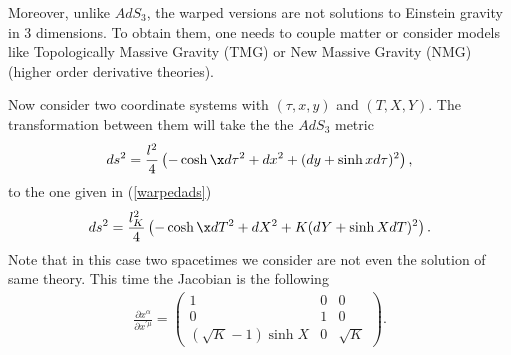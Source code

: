 \documentclass[preprint,aps,tightenlines,showkeys,nofootinbib,superscriptaddress,amsmath]{revtex4}
\begin{document}
Moreover, unlike $AdS_3$, the warped versions are not solutions to
Einstein gravity in 3 dimensions. To obtain them, one needs to couple matter or
consider models like Topologically Massive Gravity (TMG) or New
Massive Gravity (NMG) (higher order derivative theories).

Now consider two coordinate systems with $(\tau,x,y)$ and $(T,X,Y)$.
The transformation between them will take the the $AdS_3$ metric
\begin{equation}
  ds^{2}=\frac{l^{2}}{4}\left(-\cosh\x d\tau^{2}+dx^{2}+(dy+\sinh
  x d\tau )^{2} \right),
\end{equation}
to the one given in (\ref{warpedads})
\begin{equation}
  ds^{2}=\dfrac{l^{2}_K}{4}\left(-\cosh\x dT^{2}+dX^{2}+K(dY+\sinh
  X dT )^{2}   \right)\label{warpedads}.
\end{equation}
Note that in this case two spacetimes we consider are not even the
solution of same theory. This time the Jacobian is the following
\begin{eqnarray}
  \frac{\partial x^{\alpha} }{\partial x^{\prime\mu} }=
  \begin{pmatrix}
    1 & 0 & 0 \\
    0 & 1 & 0 \\
    (\sqrt{K}-1)\sinh X & 0 & \sqrt{K}
  \end{pmatrix}.
\end{eqnarray}
\end{document}
